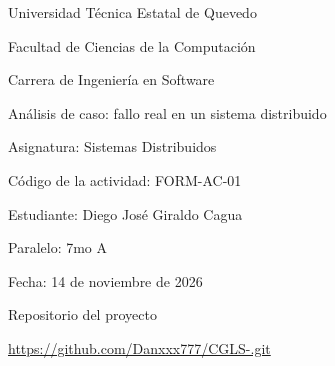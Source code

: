 \documentclass[11pt]{article}
\begin{document}
\begin{titlepage}
\centering
\thispagestyle{empty}

\vspace*{0.8cm}

{\Large Universidad Técnica Estatal de Quevedo\par}

\vspace{0.4cm}

{\large Facultad de Ciencias de la Computación\par}

\vspace{0.3cm}

{\large Carrera de Ingeniería en Software\par}

\vspace{1.6cm}

{\Large
Análisis de caso: fallo real en un sistema distribuido
\par}

\vspace{1.5cm}

{\large
Asignatura: Sistemas Distribuidos\par
}

\vspace{0.4cm}

{\large
Código de la actividad: FORM-AC-01\par
}

\vspace{0.8cm}

{\large
Estudiante: Diego José Giraldo Cagua\par
}

\vspace{0.4cm}

{\large
Paralelo: 7mo A\par
}

\vspace{0.4cm}

{\large
Fecha: 14 de noviembre de 2026\par
}

\vfill

{\normalsize Repositorio del proyecto\par}

\vspace{0.3cm}

\begin{minipage}{0.95\textwidth}
\centering
\small
\url{https://github.com/Danxxx777/CGLS-.git}
\par
\end{minipage}

\vspace*{0.8cm}

\end{titlepage}
\end{document}
